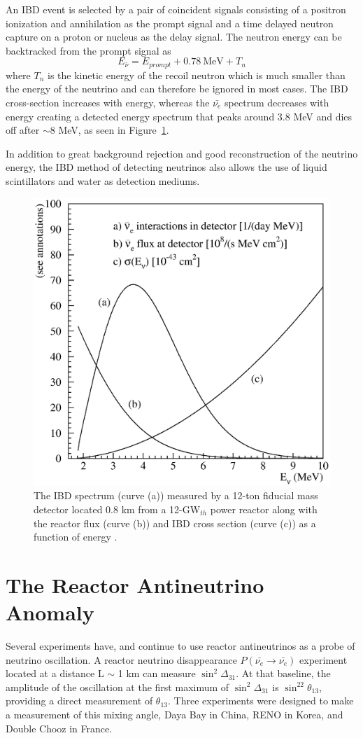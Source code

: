 An IBD event is selected by a pair of coincident signals consisting of a positron ionization and annihilation as the prompt signal and a time delayed neutron capture on a proton or nucleus as the delay signal. 
The neutron energy can be backtracked from the prompt signal as
\begin{equation}	
	E_{\bar{\nu}} = E_{prompt} + 0.78~\textrm{MeV} + T_n
\end{equation}
where $T_n$ is the kinetic energy of the recoil neutron which is much smaller than the energy of the neutrino and can therefore be ignored in most cases. 
The IBD cross-section increases with energy, whereas the $\bar{\nu_{e}}$ spectrum decreases with energy creating a detected energy spectrum that peaks around 3.8 MeV and dies off after $\sim$8 MeV, as seen in Figure~\ref{fig:vogel-fig02}. 

In addition to great background rejection and good reconstruction of the neutrino energy, the IBD method of detecting neutrinos also allows the use of liquid scintillators and water as detection mediums. 

\begin{figure}[hb]
	\centering
	\includegraphics[width=0.4\linewidth]{tex/3-reactorneutrinos-images/vogel-fig02}
	\caption[The IBD spectrum.]{The IBD spectrum (curve (a)) measured by a 12-ton fiducial mass detector located 0.8 km from a 12-GW$_{th}$ power reactor along with the reactor flux (curve (b)) and IBD cross section (curve (c)) as a function of energy \cite{PDG}.}
	\label{fig:vogel-fig02}
\end{figure}


\section{The Reactor Antineutrino Anomaly}

Several experiments have, and continue to use reactor antineutrinos as a probe of neutrino oscillation. 
A reactor neutrino disappearance $P(\bar{\nu_{e}} \rightarrow \bar{\nu_{e}})$ experiment located at a distance L $\sim$ 1 km can measure $\sin^2\Delta_{31}$. At that baseline, the amplitude of the oscillation at the first maximum of $\sin^2\Delta_{31}$ is $\sin^22\theta_{13}$, providing a direct measurement of $\theta_{13}$.
Three experiments were designed to make a measurement of this mixing angle, Daya Bay in China, RENO in Korea, and Double Chooz in France. 

